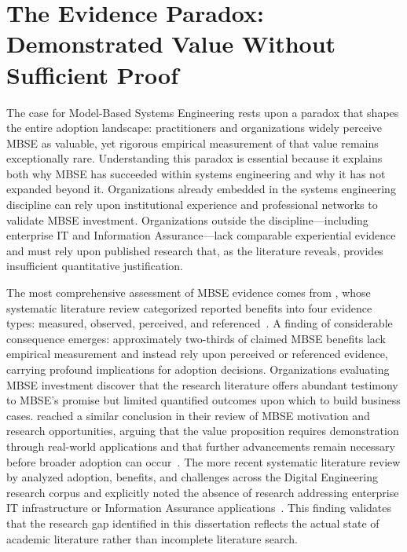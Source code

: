 \section{The Evidence Paradox: Demonstrated Value Without Sufficient Proof}

The case for Model-Based Systems Engineering rests upon a paradox that shapes the entire adoption landscape: practitioners and organizations widely perceive MBSE as valuable, yet rigorous empirical measurement of that value remains exceptionally rare. Understanding this paradox is essential because it explains both why MBSE has succeeded within systems engineering and why it has not expanded beyond it. Organizations already embedded in the systems engineering discipline can rely upon institutional experience and professional networks to validate MBSE investment. Organizations outside the discipline---including enterprise IT and Information Assurance---lack comparable experiential evidence and must rely upon published research that, as the literature reveals, provides insufficient quantitative justification.

The most comprehensive assessment of MBSE evidence comes from \citeauthor{Henderson_Salado_2021}, whose systematic literature review categorized reported benefits into four evidence types: measured, observed, perceived, and referenced~\parencite{Henderson_Salado_2021}. A finding of considerable consequence emerges: approximately two-thirds of claimed MBSE benefits lack empirical measurement and instead rely upon perceived or referenced evidence, carrying profound implications for adoption decisions. Organizations evaluating MBSE investment discover that the research literature offers abundant testimony to MBSE's promise but limited quantified outcomes upon which to build business cases. \citeauthor{Madni_Sievers_2018} reached a similar conclusion in their review of MBSE motivation and research opportunities, arguing that the value proposition requires demonstration through real-world applications and that further advancements remain necessary before broader adoption can occur~\parencite{Madni_Sievers_2018}. The more recent systematic literature review by \citeauthor{Wooley_Womack_2025} analyzed adoption, benefits, and challenges across the Digital Engineering research corpus and explicitly noted the absence of research addressing enterprise IT infrastructure or Information Assurance applications~\parencite{Wooley_Womack_2025}. This finding validates that the research gap identified in this dissertation reflects the actual state of academic literature rather than incomplete literature search.

